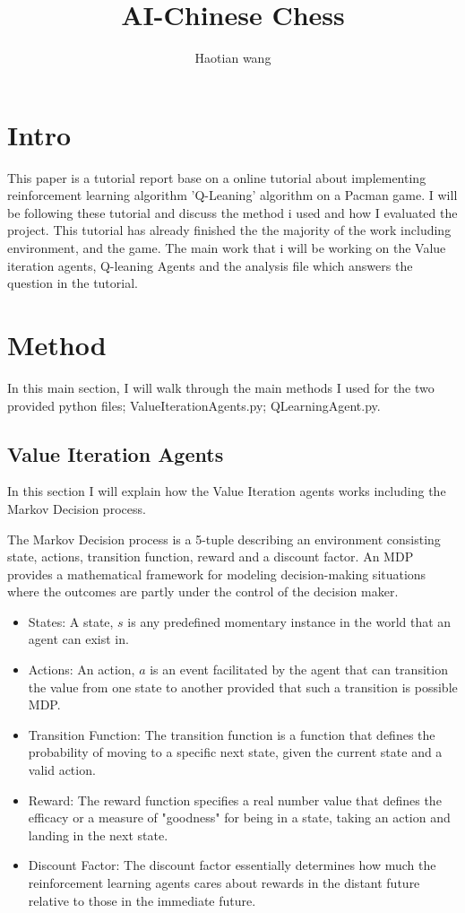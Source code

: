 \documentclass[10pt,twocolumn]{article}
\title{AI-Chinese Chess}
\author{Haotian wang}
\affiliation{Occidental College}
\begin{document}
\maketitle

\section{Intro}
This paper is a tutorial report base on a online tutorial about implementing reinforcement learning algorithm 'Q-Leaning' algorithm on a Pacman game\cite{BC}. I will be following these tutorial and discuss the method i used and how I evaluated the project. This tutorial has already finished the the majority of the work including environment, and the game. The main work that i will be working on the Value iteration agents, Q-leaning Agents and the analysis file which answers the question in the tutorial. 
\section{Method}
    In this main section, I will walk through the main methods I used for the two provided python files; ValueIterationAgents.py; QLearningAgent.py.
\subsection{Value Iteration Agents}
    In this section I will explain how the Value Iteration agents works including the Markov Decision process.
    
    The Markov Decision process is a 5-tuple describing an environment consisting state, actions, transition function, reward and a discount factor. An MDP provides a mathematical framework for modeling decision-making situations where the outcomes are partly under the control of the decision maker. 
    
     \begin{itemize}
    \item States: A state, $s$ is any predefined momentary instance in the world that an agent can exist in.
    \item Actions: An action, $a$ is an event facilitated by the agent that can transition the value from one state to another provided that such a transition is possible MDP.
    \item Transition Function: The transition function is a function that defines the probability of moving to a specific next state, given the current state and a valid action.
    \item Reward: The reward function specifies a real number value that defines the efficacy or a measure of "goodness" for being in a state, taking an action and landing in the next state.
    \item Discount Factor: The discount factor essentially determines how much the reinforcement learning agents cares about rewards in the distant future relative to those in the immediate future. 
    \end{itemize}
\end{document}
